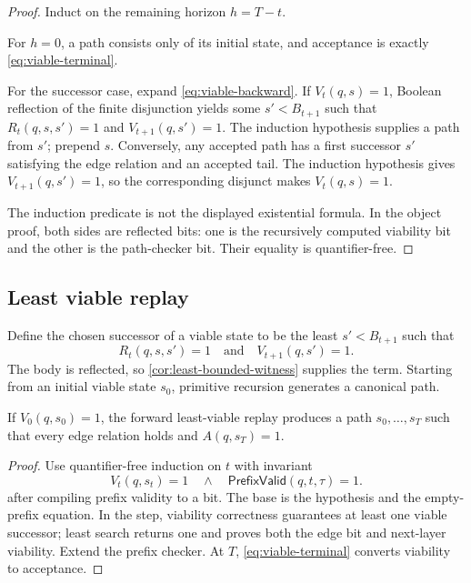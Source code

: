 \begin{proof}
Induct on the remaining horizon \(h=T-t\).

For \(h=0\), a path consists only of its initial state, and acceptance is exactly \eqref{eq:viable-terminal}.

For the successor case, expand \eqref{eq:viable-backward}.  If \(V_t(q,s)=1\), Boolean reflection of the finite disjunction yields some \(s'<B_{t+1}\) such that \(R_t(q,s,s')=1\) and \(V_{t+1}(q,s')=1\).  The induction hypothesis supplies a path from \(s'\); prepend \(s\).  Conversely, any accepted path has a first successor \(s'\) satisfying the edge relation and an accepted tail.  The induction hypothesis gives \(V_{t+1}(q,s')=1\), so the corresponding disjunct makes \(V_t(q,s)=1\).

The induction predicate is not the displayed existential formula.  In the object proof, both sides are reflected bits: one is the recursively computed viability bit and the other is the path-checker bit.  Their equality is quantifier-free.
\end{proof}

\subsection{Least viable replay}

Define the chosen successor of a viable state to be the least \(s'<B_{t+1}\) such that
\[
  R_t(q,s,s')=1\quad\text{and}\quad V_{t+1}(q,s')=1.
\]
The body is reflected, so \cref{cor:least-bounded-witness} supplies the term.  Starting from an initial viable state \(s_0\), primitive recursion generates a canonical path.

\begin{theorem}
\label{thm:least-path}
If \(V_0(q,s_0)=1\), the forward least-viable replay produces a path \(s_0,\ldots,s_T\) such that every edge relation holds and \(A(q,s_T)=1\).
\end{theorem}

\begin{proof}
Use quantifier-free induction on \(t\) with invariant
\[
  V_t(q,s_t)=1
  \quad\wedge\quad
  \mathsf{PrefixValid}(q,t,\tau)=1.
\]
after compiling prefix validity to a bit.  The base is the hypothesis and the empty-prefix equation.  In the step, viability correctness guarantees at least one viable successor; least search returns one and proves both the edge bit and next-layer viability.  Extend the prefix checker.  At \(T\), \eqref{eq:viable-terminal} converts viability to acceptance.
\end{proof}

